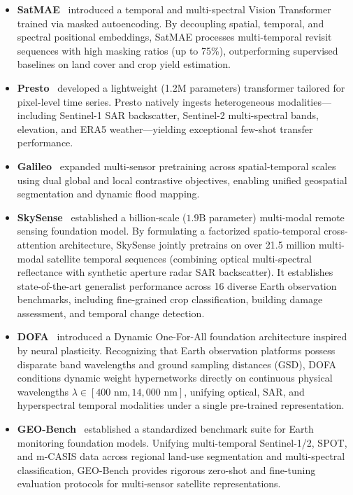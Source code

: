 \begin{itemize}
    \item \textbf{SatMAE}~\cite{cong2022satmae} introduced a temporal and multi-spectral Vision Transformer trained via masked autoencoding. By decoupling spatial, temporal, and spectral positional embeddings, SatMAE processes multi-temporal revisit sequences with high masking ratios (up to 75\%), outperforming supervised baselines on land cover and crop yield estimation.
    \item \textbf{Presto}~\cite{tseng2023presto} developed a lightweight (1.2M parameters) transformer tailored for pixel-level time series. Presto natively ingests heterogeneous modalities---including Sentinel-1 SAR backscatter, Sentinel-2 multi-spectral bands, elevation, and ERA5 weather---yielding exceptional few-shot transfer performance.
    \item \textbf{Galileo}~\cite{tseng2025galileo} expanded multi-sensor pretraining across spatial-temporal scales using dual global and local contrastive objectives, enabling unified geospatial segmentation and dynamic flood mapping.
    \item \textbf{SkySense}~\cite{guo2024skysense} established a billion-scale ($1.9\text{B}$ parameter) multi-modal remote sensing foundation model. By formulating a factorized spatio-temporal cross-attention architecture, SkySense jointly pretrains on over 21.5 million multi-modal satellite temporal sequences (combining optical multi-spectral reflectance with synthetic aperture radar SAR backscatter). It establishes state-of-the-art generalist performance across 16 diverse Earth observation benchmarks, including fine-grained crop classification, building damage assessment, and temporal change detection.
    \item \textbf{DOFA}~\cite{xiong2024dofa} introduced a Dynamic One-For-All foundation architecture inspired by neural plasticity. Recognizing that Earth observation platforms possess disparate band wavelengths and ground sampling distances (GSD), DOFA conditions dynamic weight hypernetworks directly on continuous physical wavelengths $\lambda \in [400\text{ nm}, 14{,}000\text{ nm}]$, unifying optical, SAR, and hyperspectral temporal modalities under a single pre-trained representation.
    \item \textbf{GEO-Bench}~\cite{lacoste2023geobench} established a standardized benchmark suite for Earth monitoring foundation models. Unifying multi-temporal Sentinel-1/2, SPOT, and m-CASIS data across regional land-use segmentation and multi-spectral classification, GEO-Bench provides rigorous zero-shot and fine-tuning evaluation protocols for multi-sensor satellite representations.

\end{itemize}
